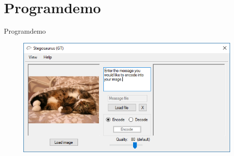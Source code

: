 \section{Programdemo}
\begin{frame}{Programdemo}{}
\begin{figure}
\centering
	\includegraphics[width=.6\textwidth]{figures/program.png}
\end{figure}
\end{frame}
